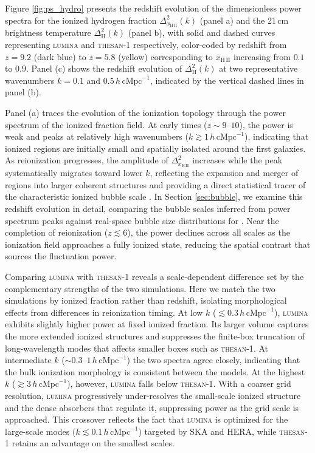 \documentclass[apj,twocolumn, appendixfloats, twocolappendix, numberedappendix, tighten]{openjournal}
\DeclareRobustCommand{\lumina}{\mbox{\textsc{lumina}}\xspace}
\begin{document}
Figure \ref{fig:ps_hydro} presents the redshift evolution of the dimensionless power spectra for the ionized hydrogen fraction $\Delta^2_{x_\mathrm{H\,II}}(k)$ (panel a) and the 21\,cm brightness temperature $\Delta^2_\mathrm{H}(k)$ (panel b), with solid and dashed curves representing \lumina and \textsc{thesan-1} \citep{Kannan2022, Kannan2022b} respectively, color-coded by redshift from $z = 9.2$ (dark blue) to $z = 5.8$ (yellow) corresponding to $\bar{x}_\mathrm{H\,II}$ increasing from $0.1$ to $0.9$. Panel (c) shows the redshift evolution of $\Delta^2_\mathrm{H}(k)$ at two representative wavenumbers $k = 0.1$ and $0.5\,h\,\mathrm{cMpc}^{-1}$, indicated by the vertical dashed lines in panel (b).



Panel (a) traces the evolution of the ionization topology through the power spectrum of the ionized fraction field. At early times ($z \sim 9$--$10$), the power is weak and peaks at relatively high wavenumbers ($k \gtrsim 1\,h\,\mathrm{cMpc}^{-1}$), indicating that ionized regions are initially small and spatially isolated around the first galaxies. As reionization progresses, the amplitude of $\Delta^2_{x_\mathrm{H\,II}}$ increases while the peak systematically migrates toward lower $k$, reflecting the expansion and merger of  regions into larger coherent structures and providing a direct statistical tracer of the characteristic ionized bubble scale \citep[e.g.,][]{Lidz2008, Furlanetto2006, Mesinger2019}. In Section \ref{sec:bubble}, we examine this redshift evolution in detail, comparing the bubble scales inferred from power spectrum peaks against real-space bubble size distributions for . Near the completion of reionization ($z \lesssim 6$), the power declines across all scales as the ionization field approaches a fully ionized state, reducing the spatial contrast that sources the fluctuation power.


Comparing \lumina with \textsc{thesan-1} reveals a scale-dependent difference set by the complementary strengths of the two simulations. Here we match the two simulations by ionized fraction rather than redshift, isolating morphological effects from differences in reionization timing. At low $k$ ($\lesssim 0.3\,h\,\mathrm{cMpc}^{-1}$), \lumina exhibits slightly higher power at fixed ionized fraction. Its larger volume captures the more extended ionized structures and suppresses the finite-box truncation of long-wavelength modes that affects smaller boxes such as \textsc{thesan-1}. At intermediate $k$ ($\sim 0.3$--$1\,h\,\mathrm{cMpc}^{-1}$) the two spectra agree closely, indicating that the bulk ionization morphology is consistent between the models. At the highest $k$ ($\gtrsim 3\,h\,\mathrm{cMpc}^{-1}$), however, \lumina falls below \textsc{thesan-1}. With a coarser grid resolution, \lumina progressively under-resolves the small-scale ionized structure and the dense absorbers that regulate it, suppressing power as the grid scale is approached. This crossover reflects the fact that  \lumina is optimized for the large-scale modes ($k \lesssim 0.1\,h\,\mathrm{cMpc}^{-1}$) targeted by SKA and HERA, while \textsc{thesan-1} retains an advantage on the smallest scales.
\end{document}
